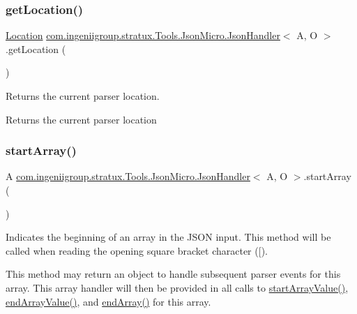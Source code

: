 \subsubsection{\texorpdfstring{get\+Location()}{getLocation()}}
{\footnotesize\ttfamily \hyperlink{classcom_1_1ingeniigroup_1_1stratux_1_1_tools_1_1_json_micro_1_1_location}{Location} \hyperlink{classcom_1_1ingeniigroup_1_1stratux_1_1_tools_1_1_json_micro_1_1_json_handler}{com.\+ingeniigroup.\+stratux.\+Tools.\+Json\+Micro.\+Json\+Handler}$<$ A, O $>$.get\+Location (\begin{DoxyParamCaption}{ }\end{DoxyParamCaption})\hspace{0.3cm}{\ttfamily [protected]}}

Returns the current parser location.

\begin{DoxyReturn}{Returns}
the current parser location 
\end{DoxyReturn}
\mbox{\label{classcom_1_1ingeniigroup_1_1stratux_1_1_tools_1_1_json_micro_1_1_json_handler_a573309df4295cb6a107c2936aa75bb85}} 
\subsubsection{\texorpdfstring{start\+Array()}{startArray()}}
{\footnotesize\ttfamily A \hyperlink{classcom_1_1ingeniigroup_1_1stratux_1_1_tools_1_1_json_micro_1_1_json_handler}{com.\+ingeniigroup.\+stratux.\+Tools.\+Json\+Micro.\+Json\+Handler}$<$ A, O $>$.start\+Array (\begin{DoxyParamCaption}{ }\end{DoxyParamCaption})}

Indicates the beginning of an array in the J\+S\+ON input. This method will be called when reading the opening square bracket character ({\ttfamily \textquotesingle{}\mbox{[}\textquotesingle{}}). 

This method may return an object to handle subsequent parser events for this array. This array handler will then be provided in all calls to \hyperlink{}{start\+Array\+Value()}, \hyperlink{}{end\+Array\+Value()}, and \hyperlink{}{end\+Array()} for this array. 


